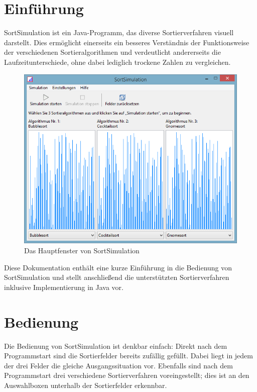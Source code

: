 \documentclass[german]{pfBook}
\begin{document}
	\maketitlepage
	\cleardoublepage
	\maketableofcontents
	\cleardoublepage
	
	\section{Einführung}
	
	SortSimulation ist ein Java-Programm, das diverse Sortierverfahren visuell darstellt. Dies ermöglicht einerseits ein besseres Verständnis der Funktionsweise der verschiedenen Sortieralgorithmen und verdeutlicht andererseits die Laufzeitunterschiede, ohne dabei lediglich trockene Zahlen zu vergleichen.
	
	\begin{figure}[h]
		\centering
		\includegraphics[scale=0.6]{images/image0.png}
		\caption{Das Hauptfenster von SortSimulation}
	\end{figure}
	
	Diese Dokumentation enthält eine kurze Einführung in die Bedienung von SortSimulation und stellt anschließend die unterstützten Sortierverfahren inklusive Implementierung in Java vor.
	
	\section{Bedienung}
	
	Die Bedienung von SortSimulation ist denkbar einfach: Direkt nach dem Programmstart sind die Sortierfelder bereits zufällig gefüllt. Dabei liegt in jedem der drei Felder die gleiche Ausgangssituation vor. Ebenfalls sind nach dem Programmstart drei verschiedene Sortierverfahren voreingestellt; dies ist an den Auswahlboxen unterhalb der Sortierfelder erkennbar.
	
\end{document}
